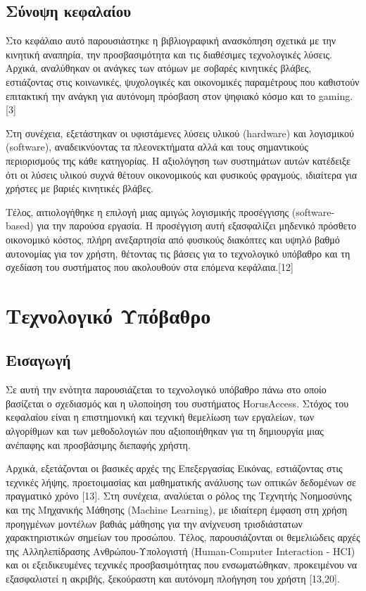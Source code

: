 \documentclass[twoside, a4paper, 11pt]{article}
\newcommand{\textlatin}[1]{\textenglish{#1}}
\begin{document}
\subsection{Σύνοψη κεφαλαίου}
Στο κεφάλαιο αυτό παρουσιάστηκε η βιβλιογραφική ανασκόπηση σχετικά με την κινητική αναπηρία, την
προσβασιμότητα και τις διαθέσιμες τεχνολογικές λύσεις. Αρχικά, αναλύθηκαν οι ανάγκες των ατόμων
με σοβαρές κινητικές βλάβες, εστιάζοντας στις κοινωνικές, ψυχολογικές και οικονομικές παραμέτρους
που καθιστούν επιτακτική την ανάγκη για αυτόνομη πρόσβαση στον ψηφιακό κόσμο και το gaming. [3]

Στη συνέχεια, εξετάστηκαν οι υφιστάμενες λύσεις υλικού (hardware) και λογισμικού (software), αναδεικνύοντας τα πλεονεκτήματα αλλά και τους σημαντικούς περιορισμούς της κάθε κατηγορίας. Η αξιολόγηση των συστημάτων αυτών κατέδειξε ότι οι λύσεις υλικού συχνά θέτουν οικονομικούς και φυσικούς
φραγμούς, ιδιαίτερα για χρήστες με βαριές κινητικές βλάβες.

Τέλος, αιτιολογήθηκε η επιλογή μιας αμιγώς λογισμικής προσέγγισης (software-based) για την παρούσα
εργασία. Η προσέγγιση αυτή εξασφαλίζει μηδενικό πρόσθετο οικονομικό κόστος, πλήρη ανεξαρτησία
από φυσικούς διακόπτες και υψηλό βαθμό αυτονομίας για τον χρήστη, θέτοντας τις βάσεις για το τεχνολογικό υπόβαθρο και τη σχεδίαση του συστήματος που ακολουθούν στα επόμενα κεφάλαια.[12]

\clearpage
\section{Τεχνολογικό Υπόβαθρο}

\subsection{Εισαγωγή}
Σε αυτή την ενότητα παρουσιάζεται το τεχνολογικό υπόβαθρο πάνω στο οποίο βασίζεται ο σχεδιασμός και η υλοποίηση του συστήματος \textlatin{HorusAccess}. Στόχος του κεφαλαίου είναι η επιστημονική και τεχνική θεμελίωση των εργαλείων, των αλγορίθμων και των μεθοδολογιών που αξιοποιήθηκαν για τη δημιουργία μιας ανέπαφης και προσβάσιμης διεπαφής χρήστη.

Αρχικά, εξετάζονται οι βασικές αρχές της Επεξεργασίας Εικόνας, εστιάζοντας στις
τεχνικές λήψης, προετοιμασίας και μαθηματικής ανάλυσης των οπτικών δεδομένων σε πραγματικό χρόνο
[13]. Στη συνέχεια, αναλύεται ο ρόλος της Τεχνητής Νοημοσύνης και της Μηχανικής Μάθησης
(Machine Learning), με ιδιαίτερη έμφαση στη χρήση προηγμένων μοντέλων βαθιάς μάθησης για την
ανίχνευση τρισδιάστατων χαρακτηριστικών σημείων του προσώπου. Τέλος,
παρουσιάζονται οι θεμελιώδεις αρχές της Αλληλεπίδρασης Ανθρώπου-Υπολογιστή (Human-Computer
Interaction - HCI) και οι εξειδικευμένες τεχνικές προσβασιμότητας που ενσωματώθηκαν, προκειμένου
να εξασφαλιστεί η ακριβής, ξεκούραστη και αυτόνομη πλοήγηση του χρήστη [13,20].
\end{document}
